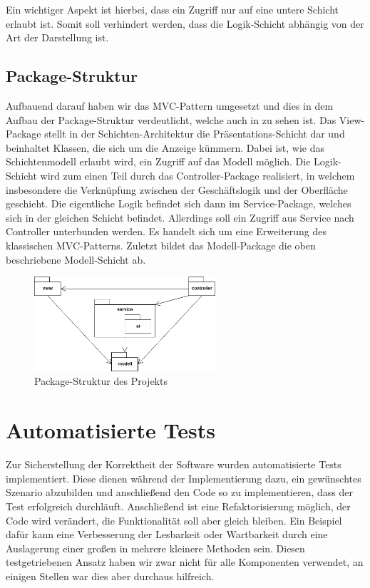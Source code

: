 Ein wichtiger Aspekt ist hierbei, dass ein Zugriff nur auf eine untere Schicht erlaubt ist.
Somit soll verhindert werden, dass die Logik-Schicht \bspw abhängig von der Art der Darstellung ist. \\

\subsection{Package-Struktur}
\label{subsec:package-struktur}

Aufbauend darauf haben wir das \ac{MVC}-Pattern umgesetzt und dies in dem Aufbau der Package-Struktur verdeutlicht,
welche auch in  zu sehen ist.
Das View-Package stellt in der Schichten-Architektur die Präsentations-Schicht dar und beinhaltet Klassen, die sich um
die Anzeige kümmern.
Dabei ist, wie das Schichtenmodell erlaubt wird, ein Zugriff auf das Modell möglich.
Die Logik-Schicht wird zum einen Teil durch das Controller-Package realisiert, in welchem insbesondere die Verknüpfung
zwischen der Geschäftslogik und der Oberfläche geschieht.
Die eigentliche Logik befindet sich dann im Service-Package, welches sich in der gleichen Schicht befindet.
Allerdings soll ein Zugriff aus Service nach Controller unterbunden werden.
Es handelt sich um eine Erweiterung des klassischen MVC-Patterns.
Zuletzt bildet das Modell-Package die oben beschriebene Modell-Schicht ab.

\begin{figure}[htb]
\centering
\includegraphics[width=0.6\textwidth]{Bilder/Diagramm_Paketstruktur.png}
\caption{Package-Struktur des Projekts}
\label{fig:package-struktur}
\end{figure}

\section{Automatisierte Tests}
\label{sec:tests}

Zur Sicherstellung der Korrektheit der Software wurden automatisierte Tests implementiert.
Diese dienen während der Implementierung dazu, ein gewünschtes Szenario abzubilden und anschließend den Code so zu
implementieren, dass der Test erfolgreich durchläuft.
Anschließend ist eine Refaktorisierung möglich, \dasheisst der Code wird verändert, die Funktionalität soll aber gleich
bleiben.
Ein Beispiel dafür kann eine Verbesserung der Lesbarkeit oder Wartbarkeit durch eine Auslagerung einer großen in
mehrere kleinere Methoden sein.
Diesen testgetriebenen Ansatz haben wir zwar nicht für alle Komponenten verwendet, an einigen Stellen war dies aber
durchaus hilfreich. \\

